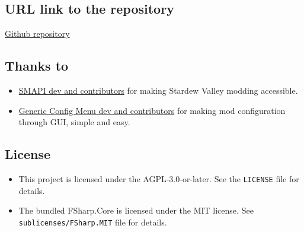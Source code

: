\documentclass[a4paper,12pt]{article}
\begin{document}
	\subsection{URL link to the repository}
	\href{https://github.com/cloudyluna/StardewValleyMods/tree/main/SelectiveEating}{Github repository}
	
	\subsection{Thanks to}
	\begin{itemize}
		\item \href{https://github.com/Pathoschild/SMAPI}{SMAPI dev and contributors} for making Stardew Valley modding accessible.
		
		\item \href{https://www.nexusmods.com/stardewvalley/mods/5098}{Generic Config Menu dev and contributors} for making mod configuration through GUI, simple and easy.
	\end{itemize}
	
	\subsection{License}
	
	\begin{itemize}
		\item This project is licensed under the AGPL-3.0-or-later. See the \texttt{LICENSE} file for details.
		
		\item  The bundled FSharp.Core is licensed under the MIT license. See \texttt{sublicenses/FSharp.MIT} file for details.
	\end{itemize}
	
	
\end{document}
